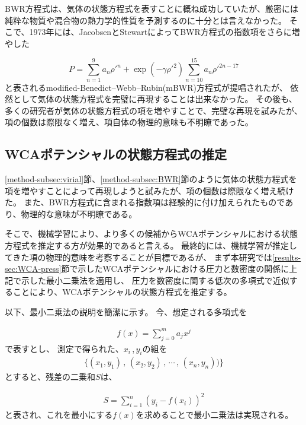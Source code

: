 \documentclass[titlepage]{jsreport}
\begin{document}
{{{BWR方程式は、気体の状態方程式を表すことに概ね成功していたが、厳密には純粋な物質や混合物の熱力学的性質を予測するのに十分とは言えなかった。
そこで、1973年には、JacobsenとStewartによってBWR方程式の指数項をさらに増やした

\large
\begin{equation}
P=\sum_{n=1}^9a_n{{\rho}'}^n+\exp(-{\gamma}{{\rho}'}^2)\sum_{n=10}^{15}a_n{{\rho}'}^{2n-17}\label{eq:mBWR}
\end{equation}
\normalsize
と表されるmodified-Benedict–Webb–Rubin(mBWR)方程式が提唱\cite{m-BWR-equation}されたが、
依然として気体の状態方程式を完璧に再現することは出来なかった。
その後も、多くの研究者が気体の状態方程式の項を増やすことで、完璧な再現を試みた\cite{MCCARTY1974276,BWR-equation:13,BWR-equation:25}が、項の個数は際限なく増え、項自体の物理的意味も不明瞭であった。

\subsection{WCAポテンシャルの状態方程式の推定}\label{method-subsec:WCA-equation}
\ref{method-subsec:virial}節、\ref{method-subsec:BWR}節のように気体の状態方程式を項を増やすことによって再現しようと試みたが、項の個数は際限なく増え続けた。
また、BWR方程式に含まれる指数項は経験的に付け加えられたものであり、物理的な意味が不明瞭である。

そこで、機械学習により、より多くの候補からWCAポテンシャルにおける状態方程式を推定する方が効果的であると言える。
最終的には、機械学習が推定してきた項の物理的意味を考察することが目標であるが、
まず本研究では\ref{results-sec:WCA-press}節で示したWCAポテンシャルにおける圧力と数密度の関係に上記で示した最小二乗法を適用し、
圧力を数密度に関する低次の多項式で近似することにより、WCAポテンシャルの状態方程式を推定する。

以下、最小二乗法の説明を簡潔に示す。
今、想定される多項式を

\large
\begin{eqnarray}
f(x)=\sum_{j=0}^m a_jx^j \nonumber
\end{eqnarray}
\normalsize
で表すとし、
測定で得られた、$x_i$\,,\,$y_i$の組を
\large
\begin{eqnarray}
\{(x_1,y_1)\,,\,(x_2,y_2)\,,\,\cdots\,,\,(x_n,y_n)) \}\nonumber
\end{eqnarray}
\normalsize
とすると、残差の二乗和$S$は、

\large
\begin{eqnarray}
S=\sum_{i=1}^n (y_i-f(x_i))^2\label{eq:residual-error}
\end{eqnarray}
\normalsize
と表され、これを最小にする$f(x)$を求めることで最小二乗法は実現される。


}}}
\end{document}
